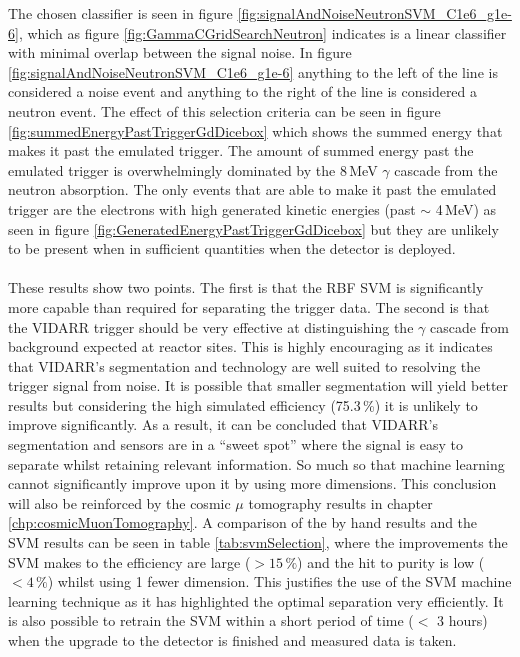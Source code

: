 The chosen classifier is seen in figure \ref{fig:signalAndNoiseNeutronSVM_C1e6_g1e-6}, which as figure \ref{fig:GammaCGridSearchNeutron} indicates is a linear classifier with minimal overlap between the signal noise. In figure \ref{fig:signalAndNoiseNeutronSVM_C1e6_g1e-6} anything to the left of the line is considered a noise event and anything to the right of the line is considered a neutron event. The effect of this selection criteria can be seen in figure \ref{fig:summedEnergyPastTriggerGdDicebox} which shows the summed energy that makes it past the emulated trigger. The amount of summed energy past the emulated trigger is overwhelmingly dominated by the 8\,MeV $\gamma$ cascade from the neutron absorption. The only events that are able to make it past the emulated trigger are the electrons with high generated kinetic energies (past $\sim$ 4\,MeV) as seen in figure \ref{fig:GeneratedEnergyPastTriggerGdDicebox} but they are unlikely to be present when in sufficient quantities when the detector is deployed. 
\\\\These results show two points. The first is that the RBF SVM is significantly more capable than required for separating the trigger data. The second is that the VIDARR trigger should be very effective at distinguishing the $\gamma$ cascade from background expected at reactor sites. This is highly encouraging as it indicates that VIDARR's segmentation and technology are well suited to resolving the trigger signal from noise. It is possible that smaller segmentation will yield better results but considering the high simulated efficiency (75.3\,\%) it is unlikely to improve significantly. As a result, it can be concluded that VIDARR's segmentation and sensors are in a ``sweet spot'' where the signal is easy to separate whilst retaining relevant information. So much so that machine learning cannot significantly improve upon it by using more dimensions. This conclusion will also be reinforced by the cosmic $\mu$ tomography results in chapter \ref{chp:cosmicMuonTomography}. A comparison of the by hand results and the SVM results can be seen in table \ref{tab:svmSelection}, where the improvements the SVM makes to the efficiency are large ($> 15\,\%$) and the hit to purity is low ($< 4\,\%$) whilst using 1 fewer dimension. This justifies the use of the SVM machine learning technique as it has highlighted the optimal separation very efficiently. It is also possible to retrain the SVM within a short period of time ($<$ 3 hours) when the upgrade to the detector is finished and measured data is taken.  

